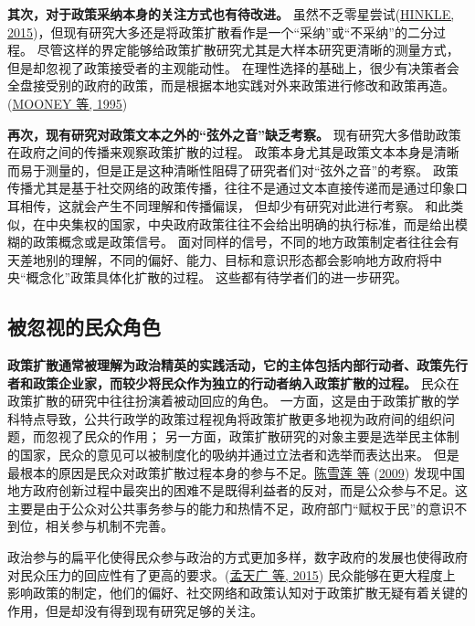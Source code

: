 \documentclass[
  12pt,
]{ctexart}
\begin{document}
\textbf{其次，对于政策采纳本身的关注方式也有待改进。}
虽然不乏零星尝试(\protect\hyperlink{ref-Hinkle2015}{HINKLE, 2015})，但现有研究大多还是将政策扩散看作是一个``采纳''或``不采纳''的二分过程。
尽管这样的界定能够给政策扩散研究尤其是大样本研究更清晰的测量方式，但是却忽视了政策接受者的主观能动性。
在理性选择的基础上，很少有决策者会全盘接受别的政府的政策，而是根据本地实践对外来政策进行修改和政策再造。(\protect\hyperlink{ref-MooneyLee1995}{MOONEY 等, 1995})

\textbf{再次，现有研究对政策文本之外的``弦外之音''缺乏考察。}
现有研究大多借助政策在政府之间的传播来观察政策扩散的过程。
政策本身尤其是政策文本本身是清晰而易于测量的，但是正是这种清晰性阻碍了研究者们对``弦外之音''的考察。
政策传播尤其是基于社交网络的政策传播，往往不是通过文本直接传递而是通过印象口耳相传，这就会产生不同理解和传播偏误，
但却少有研究对此进行考察。
和此类似，在中央集权的国家，中央政府政策往往不会给出明确的执行标准，而是给出模糊的政策概念或是政策信号。
面对同样的信号，不同的地方政策制定者往往会有天差地别的理解，不同的偏好、能力、目标和意识形态都会影响地方政府将中央``概念化''政策具体化扩散的过程。
这些都有待学者们的进一步研究。

\hypertarget{ux88abux5ffdux89c6ux7684ux6c11ux4f17ux89d2ux8272}{%
\subsection{被忽视的民众角色}\label{ux88abux5ffdux89c6ux7684ux6c11ux4f17ux89d2ux8272}}

\textbf{政策扩散通常被理解为政治精英的实践活动，它的主体包括内部行动者、政策先行者和政策企业家，而较少将民众作为独立的行动者纳入政策扩散的过程。}
民众在政策扩散的研究中往往扮演着被动回应的角色。
一方面，这是由于政策扩散的学科特点导致，公共行政学的政策过程视角将政策扩散更多地视为政府间的组织问题，而忽视了民众的作用；
另一方面，政策扩散研究的对象主要是选举民主体制的国家，民众的意见可以被制度化的吸纳并通过立法者和选举而表达出来。
但是最根本的原因是民众对政策扩散过程本身的参与不足。\protect\hyperlink{ref-ChenXueLianYangXueDong2009}{陈雪莲 等} (\protect\hyperlink{ref-ChenXueLianYangXueDong2009}{2009}) 发现中国地方政府创新过程中最突出的困难不是既得利益者的反对，而是公众参与不足。这主要是由于公众对公共事务参与的能力和热情不足，政府部门``赋权于民''的意识不到位，相关参与机制不完善。

政治参与的扁平化使得民众参与政治的方式更加多样，数字政府的发展也使得政府对民众压力的回应性有了更高的要求。(\protect\hyperlink{ref-MengTianGuangLiFeng2015a}{孟天广 等, 2015})
民众能够在更大程度上影响政策的制定，他们的偏好、社交网络和政策认知对于政策扩散无疑有着关键的作用，但是却没有得到现有研究足够的关注。
\end{document}
